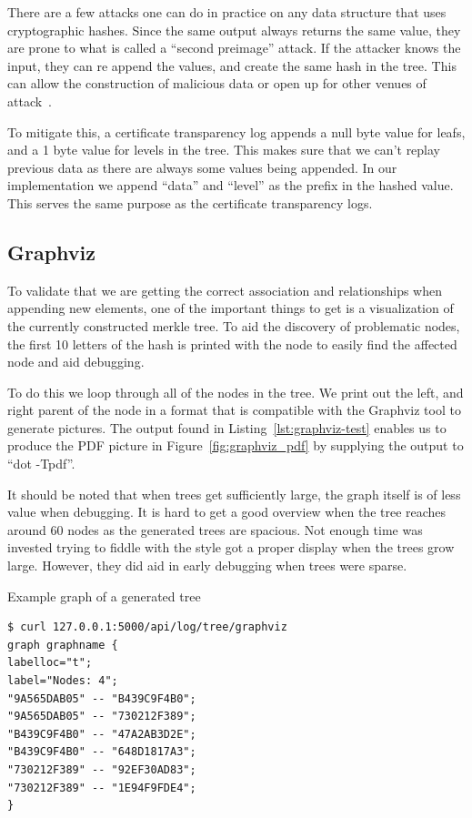 \documentclass[../Main/thesis.tex]{subfiles}
\begin{document}
There are a few attacks one can do in practice on any data structure that uses
cryptographic hashes. Since the same output always returns the same value, they
are prone to what is called a ``second preimage'' attack. If the
attacker knows the input, they can re append the values, and create the same hash
in the tree.  This can allow the construction of malicious data or open up for
other venues of attack~\cite{rfc4270}.

To mitigate this, a certificate transparency log appends a null byte value for
leafs, and a 1 byte value for levels in the tree. This makes sure that we can't
replay previous data as there are always some values being appended. In our
implementation we append ``data'' and ``level'' as the prefix in the hashed
value. This serves the same purpose as the certificate transparency logs.


\subsection*{Graphviz}%
\label{sub:graph_merkle_tree}
To validate that we are getting the correct association and relationships when
appending new elements, one of the important things to get is a visualization of
the currently constructed merkle tree. To aid the discovery of problematic
nodes, the first 10 letters of the hash is printed with the node to easily find
the affected node and aid debugging.

To do this we loop through all of the nodes in the tree. We print out the left,
and right parent of the node in a format that is compatible with the Graphviz
tool to generate pictures. The output found in Listing~\ref{lst:graphviz-test}
enables us to produce the PDF picture in Figure~\ref{fig:graphviz_pdf} by
supplying the output to ``dot -Tpdf''.

It should be noted that when trees get sufficiently large, the graph itself is
of less value when debugging. It is hard to get a good overview when the tree
reaches around 60 nodes as the generated trees are spacious. Not enough time was
invested trying to fiddle with the style got a proper display when the trees
grow large. However, they did aid in early debugging when trees were sparse.

\begin{listing}[H]
\caption{Example graph of a generated tree}
\label{lst:graphviz-test}
\begin{verbatim}
$ curl 127.0.0.1:5000/api/log/tree/graphviz                        
graph graphname {
labelloc="t";
label="Nodes: 4";
"9A565DAB05" -- "B439C9F4B0";
"9A565DAB05" -- "730212F389";
"B439C9F4B0" -- "47A2AB3D2E";
"B439C9F4B0" -- "648D1817A3";
"730212F389" -- "92EF30AD83";
"730212F389" -- "1E94F9FDE4";
}
\end{verbatim}
\end{listing}
\end{document}
